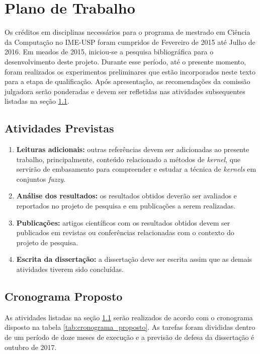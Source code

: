 \chapter{Plano de Trabalho}
\label{cap:conclusoes}

Os créditos em disciplinas necessários para o programa de mestrado em Ciência da Computação no IME-USP foram cumpridos de Fevereiro de 2015 até Julho de 2016. Em meados de 2015, iniciou-se a pesquisa bibliográfica para o desenvolvimento deste projeto. Durante esse período, até o presente momento, foram realizados os experimentos preliminares que estão incorporados neste texto para a etapa de qualificação. Após apresentação, as recomendações da comissão julgadora serão ponderadas e devem ser refletidas nas atividades subsequentes listadas na seção \ref{sec:atividades_previstas}.

\section{Atividades Previstas}
\label{sec:atividades_previstas}
\begin{enumerate}
    \item \textbf{Leituras adicionais:} outras referências devem ser adicionadas ao presente trabalho, principalmente, conteúdo relacionado a métodos de \emph{kernel}, que servirão de embasamento para compreender e estudar a técnica de \emph{kernels} em conjuntos \emph{fuzzy}.
    
    \item \textbf{Análise dos resultados:} os resultados obtidos deverão ser avaliados e reportados no projeto de pesquisa e em publicações a serem realizadas.
    
    \item \textbf{Publicações:} artigos científicos com os resultados obtidos devem ser publicados em revistas ou conferências relacionadas com o contexto do projeto de pesquisa.
    
    \item \textbf{Escrita da dissertação:} a dissertação deve ser escrita assim que as demais atividades tiverem sido concluídas.
\end{enumerate}

\section{Cronograma Proposto}
\label{sec:cronograma}
As atividades listadas na seção \ref{sec:atividades_previstas} serão realizados de acordo com o cronograma disposto na tabela \ref{tab:cronograma_proposto}. As tarefas foram divididas dentro de um período de doze meses de execução e a previsão de defesa da dissertação é outubro de 2017.

